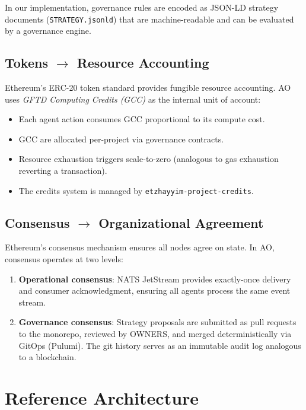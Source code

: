 \documentclass[11pt,a4paper]{article}
\begin{document}
In our implementation, governance rules are encoded as JSON-LD strategy
documents (\texttt{STRATEGY.jsonld}) that are machine-readable and can be
evaluated by a governance engine.

\subsection{Tokens $\rightarrow$ Resource Accounting}

Ethereum's ERC-20 token standard provides fungible resource accounting. AO
uses \emph{GFTD Computing Credits (GCC)} as the internal unit of account:

\begin{itemize}[nosep]
  \item Each agent action consumes GCC proportional to its compute cost.
  \item GCC are allocated per-project via governance contracts.
  \item Resource exhaustion triggers scale-to-zero (analogous to gas exhaustion
    reverting a transaction).
  \item The credits system is managed by \texttt{etzhayyim-project-credits}.
\end{itemize}

\subsection{Consensus $\rightarrow$ Organizational Agreement}

Ethereum's consensus mechanism ensures all nodes agree on state. In AO,
consensus operates at two levels:

\begin{enumerate}[nosep]
  \item \textbf{Operational consensus}: NATS JetStream provides exactly-once
    delivery and consumer acknowledgment, ensuring all agents process the
    same event stream.
  \item \textbf{Governance consensus}: Strategy proposals are submitted as
    pull requests to the monorepo, reviewed by OWNERS, and merged
    deterministically via GitOps (Pulumi). The git history serves as an
    immutable audit log analogous to a blockchain.
\end{enumerate}

\section{Reference Architecture}
\end{document}
